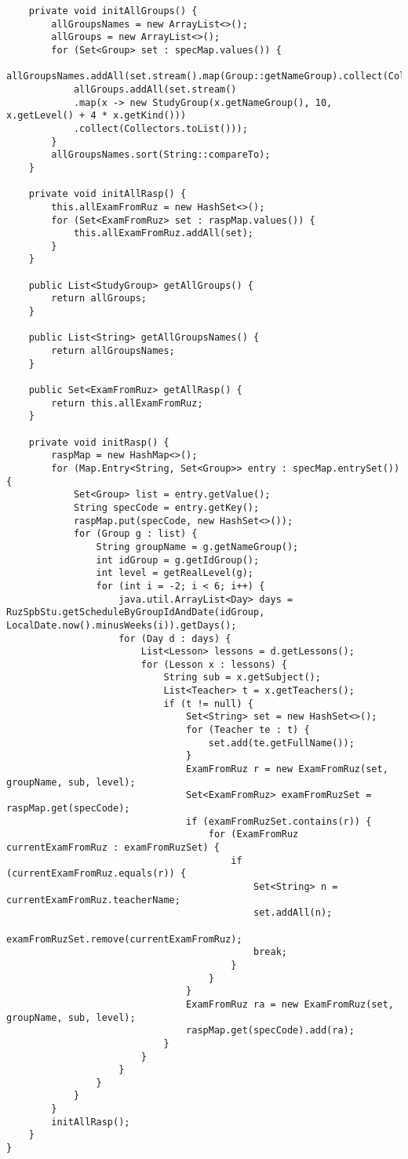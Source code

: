 \begin{lstlisting}
	private void initAllGroups() {
		allGroupsNames = new ArrayList<>();
		allGroups = new ArrayList<>();
		for (Set<Group> set : specMap.values()) {
			allGroupsNames.addAll(set.stream().map(Group::getNameGroup).collect(Collectors.toList()));
			allGroups.addAll(set.stream()
			.map(x -> new StudyGroup(x.getNameGroup(), 10, x.getLevel() + 4 * x.getKind()))
			.collect(Collectors.toList()));
		}
		allGroupsNames.sort(String::compareTo);
	}
	
	private void initAllRasp() {
		this.allExamFromRuz = new HashSet<>();
		for (Set<ExamFromRuz> set : raspMap.values()) {
			this.allExamFromRuz.addAll(set);
		}
	}
	
	public List<StudyGroup> getAllGroups() {
		return allGroups;
	}
	
	public List<String> getAllGroupsNames() {
		return allGroupsNames;
	}
	
	public Set<ExamFromRuz> getAllRasp() {
		return this.allExamFromRuz;
	}
	
	private void initRasp() {
		raspMap = new HashMap<>();
		for (Map.Entry<String, Set<Group>> entry : specMap.entrySet()) {
			Set<Group> list = entry.getValue();
			String specCode = entry.getKey();
			raspMap.put(specCode, new HashSet<>());
			for (Group g : list) {
				String groupName = g.getNameGroup();
				int idGroup = g.getIdGroup();
				int level = getRealLevel(g);
				for (int i = -2; i < 6; i++) {
					java.util.ArrayList<Day> days = RuzSpbStu.getScheduleByGroupIdAndDate(idGroup, LocalDate.now().minusWeeks(i)).getDays();
					for (Day d : days) {
						List<Lesson> lessons = d.getLessons();
						for (Lesson x : lessons) {
							String sub = x.getSubject();
							List<Teacher> t = x.getTeachers();
							if (t != null) {
								Set<String> set = new HashSet<>();
								for (Teacher te : t) {
									set.add(te.getFullName());
								}
								ExamFromRuz r = new ExamFromRuz(set, groupName, sub, level);
								Set<ExamFromRuz> examFromRuzSet = raspMap.get(specCode);
								if (examFromRuzSet.contains(r)) {
									for (ExamFromRuz currentExamFromRuz : examFromRuzSet) {
										if (currentExamFromRuz.equals(r)) {
											Set<String> n = currentExamFromRuz.teacherName;
											set.addAll(n);
											examFromRuzSet.remove(currentExamFromRuz);
											break;
										}
									}
								}
								ExamFromRuz ra = new ExamFromRuz(set, groupName, sub, level);
								raspMap.get(specCode).add(ra);
							}
						}
					}
				}
			}
		}
		initAllRasp();
	}
}

\end{lstlisting}		